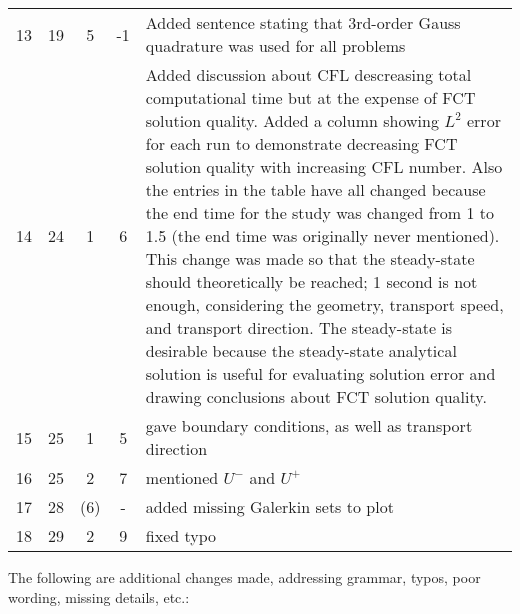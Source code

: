\begin{tabular}{c c c c p{3in}}
13 & 19 & 5 & -1 & Added sentence stating that 3rd-order Gauss quadrature was used for all problems\\
14 & 24 & 1 & 6 & Added discussion about CFL descreasing total computational time
  but at the expense of FCT solution quality. Added a column showing $L^2$ error
  for each run to demonstrate decreasing FCT solution quality with increasing
  CFL number. Also the entries in the table have all changed because the end
  time for the study was changed from 1 to 1.5 (the end time was originally never mentioned).
  This change was made so that the steady-state should theoretically be reached; 1 second
  is not enough, considering the geometry, transport speed, and transport direction.
  The steady-state is desirable because the steady-state analytical solution is
  useful for evaluating solution error and drawing conclusions about FCT solution quality.\\
15 & 25 & 1 & 5 & gave boundary conditions, as well as transport direction\\
16 & 25 & 2 & 7 & mentioned $U^-$ and $U^+$\\
17 & 28 & (6) & - & added missing Galerkin sets to plot\\
18 & 29 & 2 & 9 & fixed typo\\
\end{tabular}

The following are additional changes made, addressing grammar, typos, poor
wording, missing details, etc.:

